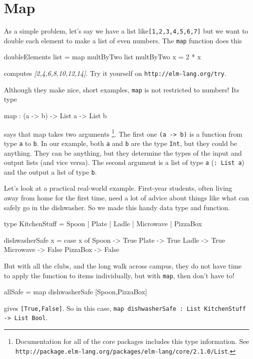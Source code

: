\documentclass[12pt]{amsbook}
\begin{document}
\section{Map}
As a simple problem, let's say we have a list like\texttt{[1,2,3,4,5,6,7]} but we want to double each element to make a list of even numbers.  The \texttt{map} function does this
\begin{code}
doubleElements list = map multByTwo list
multByTwo x = 2 * x
\end{code}
computes \textit{[2,4,6,8,10,12,14]}.  Try it yourself on \texttt{http://elm-lang.org/try}.

Although they make nice, short examples, \texttt{map} is not restricted to numbers!  Its type
\begin{code}
map : (a -> b) -> List a -> List b
\end{code}
says that map takes two arguments%
\footnote{Documentation for all of the core packages includes this type information.  
See \texttt{http://package.elm-lang.org/packages/elm-lang/core/2.1.0/List}.
}.  
The first one \texttt{(a -> b)} is a function from 
type \texttt{a} to \texttt{b}.
In our example, both \texttt{a} and \texttt{b} are the type \texttt{Int}, but they could be anything.
They can be anything, but they determine the
types of the input and output lists (and vice versa).
The second argument is a list of type \texttt{a} (\texttt{: List a}) and the output a list of type  
\texttt{b}.
 
Let's look at a practical real-world example. 
First-year students, often living away from home for the first time,
need a lot of advice about things like what can safely go in the dishwasher. 
So we made this handy data type and function.
\begin{code}
type KitchenStuff = Spoon | Plate | Ladle | Microwave | PizzaBox

dishwasherSafe x = case x of
                     Spoon      -> True
                     Plate      -> True
                     Ladle      -> True
                     Microwave  -> False
                     PizzaBox   -> False
\end{code}
But with all the clubs, and the long walk across campus, they do not have time to apply the function to items individually, but with \texttt{map}, then don't have to!
\begin{code}
allSafe = map dishwasherSafe [Spoon,PizzaBox]
\end{code}
gives \texttt{[True,False]}.
So in this case, \texttt{map dishwasherSafe : List KitchenStuff -> List Bool}.
\end{document}
